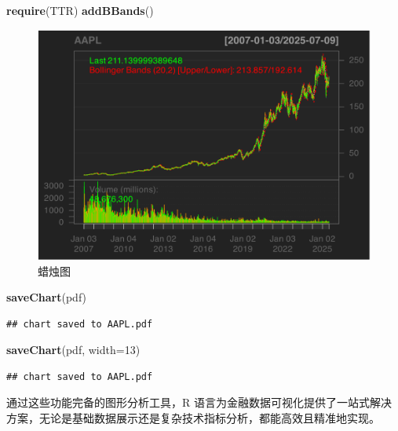 \documentclass[]{ctexbook}
\newenvironment{Shaded}{\begin{snugshade}}{\end{snugshade}}
\newcommand{\AttributeTok}[1]{\textcolor[rgb]{0.13,0.29,0.53}{#1}}
\newcommand{\DecValTok}[1]{\textcolor[rgb]{0.00,0.00,0.81}{#1}}
\newcommand{\FunctionTok}[1]{\textcolor[rgb]{0.13,0.29,0.53}{\textbf{#1}}}
\newcommand{\NormalTok}[1]{#1}
\newcommand{\StringTok}[1]{\textcolor[rgb]{0.31,0.60,0.02}{#1}}
\begin{document}
\begin{Shaded}
\begin{Highlighting}[]
\FunctionTok{require}\NormalTok{(TTR)}
\FunctionTok{addBBands}\NormalTok{()}
\end{Highlighting}
\end{Shaded}

\begin{figure}
\includegraphics[width=0.9\linewidth]{quantmod_files/figure-latex/savePdf-2} \caption{蜡烛图}\label{fig:savePdf-2}
\end{figure}

\begin{Shaded}
\begin{Highlighting}[]
\FunctionTok{saveChart}\NormalTok{(}\StringTok{\textquotesingle{}pdf\textquotesingle{}}\NormalTok{)}
\end{Highlighting}
\end{Shaded}

\begin{verbatim}
## chart saved to AAPL.pdf
\end{verbatim}

\begin{Shaded}
\begin{Highlighting}[]
\FunctionTok{saveChart}\NormalTok{(}\StringTok{\textquotesingle{}pdf\textquotesingle{}}\NormalTok{, }\AttributeTok{width=}\DecValTok{13}\NormalTok{)}
\end{Highlighting}
\end{Shaded}

\begin{verbatim}
## chart saved to AAPL.pdf
\end{verbatim}

通过这些功能完备的图形分析工具，R 语言为金融数据可视化提供了一站式解决方案，无论是基础数据展示还是复杂技术指标分析，都能高效且精准地实现。
\end{document}
